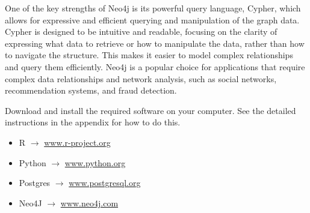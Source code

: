 \begin{withcode}
One of the key strengths of Neo4j is its powerful query language, Cypher, which allows for expressive and efficient querying and manipulation of the graph data. Cypher is designed to be intuitive and readable, focusing on the clarity of expressing what data to retrieve or how to manipulate the data, rather than how to navigate the structure. This makes it easier to model complex relationships and query them efficiently. Neo4j is a popular choice for applications that require complex data relationships and network analysis, such as social networks, recommendation systems, and fraud detection.

\begin{exerciseboxcomputer}

Download and install the required software on your computer.  See the detailed instructions in the appendix for how to do this.

	\begin{itemize}
		\item R $\rightarrow$ \url{www.r-project.org}
		\item Python $\rightarrow$ \url{www.python.org}
		\item Postgres $\rightarrow$ \url{www.postgresql.org}
		\item Neo4J $\rightarrow$ \url{www.neo4j.com}
	\end{itemize}

\end{exerciseboxcomputer}
\end{withcode}





